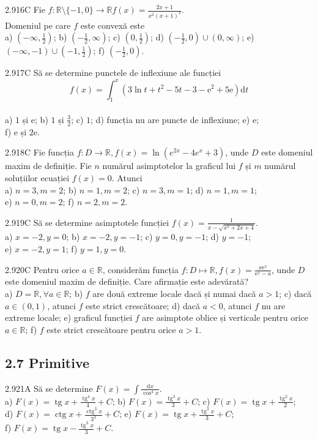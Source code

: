 \documentclass[11pt]{article}
\begin{document}
2.916C Fie $f: \mathbb{R} \setminus\{-1,0\} \rightarrow \mathbb{R} f(x)=\frac{2 x+1}{x^{2}(x+1)^{2}}$.\\Domeniul pe care $f$ este convexă este\\ a) $\left(-\infty, \frac{1}{2}\right)$; b) $\left(-\frac{1}{2}, \infty\right)$; c) $\left(0, \frac{1}{2}\right)$; d) $\left(-\frac{1}{2}, 0\right) \cup(0, \infty)$; e) $(-\infty,-1) \cup\left(-1, \frac{1}{2}\right)$; f) $\left(-\frac{1}{2}, 0\right)$.

2.917C Să se determine punctele de inflexiune ale funcției $$f(x)=\int_{1}^{x}\left(3 \ln t+t^{2}-5 t-3-\mathrm{e}^{2}+5 \mathrm{e}\right) \mathrm{d} t$$\\ a) $1$ și $\mathrm{e}$; b) $1$ și $\frac{3}{2}$; c) $1$; d) funcția nu are puncte de inflexiune; e) $\mathrm{e}$;\\ f) $\mathrm{e}$ și $2 \mathrm{e}$.

2.918C Fie funcția $f: D \rightarrow \mathbb{R}, f(x)=\ln \left(e^{2 x}-4 e^{x}+3\right)$, unde $D$ este domeniul maxim de definiție. Fie $n$ numărul asimptotelor la graficul lui $f$ și $m$ numărul soluțiilor ecuației $f(x)=0$. Atunci\\ a) $n=3, m=2$; b) $n=1, m=2$; c) $n=3, m=1$; d) $n=1, m=1$;\\ e) $n=0, m=2$; f) $n=2, m=2$.

2.919C Să se determine asimptotele funcției $f(x)=\frac{1}{x-\sqrt{x^{2}+2 x+4}}$.\\ a) $x=-2, y=0$; b) $x=-2, y=-1$; c) $y=0, y=-1$; d) $y=-1$;\\ e) $x=-2, y=1$; f) $y=1, y=0$.

2.920C Pentru orice $a \in \mathbb{R}$, considerăm funcția $f: D \mapsto \mathbb{R}, f(x)=\frac{x \mathrm{e}^{x}}{\mathrm{e}^{x}-a}$, unde $D$ este domeniul maxim de definiție. Care afirmație este adevărată?\\ a) $D=\mathbb{R}, \forall a \in \mathbb{R}$; b) $f$ are două extreme locale dacă și numai dacă $a>1$; c) dacă $a \in(0,1)$, atunci $f$ este strict crescătoare; d) dacă $a<0$, atunci $f$ nu are extreme locale; e) graficul funcției $f$ are asimptote oblice și verticale pentru orice $a \in \mathbb{R}$; f) $f$ este strict crescătoare pentru orice $a>1$.

\subsection*{2.7 Primitive}
2.921A Să se determine $F(x)=\int \frac{\mathrm{d} x}{\cos ^{4} x}$.\\ a) $F(x)=\operatorname{tg} x+\frac{\operatorname{tg}^{4} x}{4}+C$; b) $F(x)=\frac{\operatorname{tg}^{3} x}{3}+C$; c) $F(x)=\operatorname{tg} x+\frac{\operatorname{tg}^{2} x}{2}$;\\ d) $F(x)=\operatorname{ctg} x+\frac{\operatorname{ctg}^{3} x}{3^{3}}+C$; e) $F(x)=\operatorname{tg} x+\frac{\operatorname{tg}^{3} x}{3}+C$;\\ f) $F(x)=\operatorname{tg} x-\frac{\operatorname{tg}^{3} x}{3}+C$.
\end{document}
